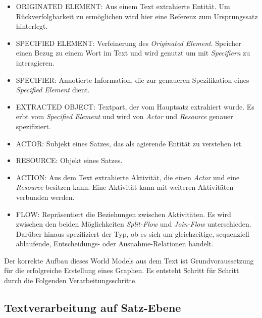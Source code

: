 \begin{itemize} 
\item ORIGINATED ELEMENT: Aus einem Text extrahierte Entität. Um Rückverfolgbarkeit zu ermöglichen wird hier eine Referenz zum Ursprungssatz hinterlegt.
\item SPECIFIED ELEMENT: Verfeinerung des \textit{Originated Element}. Speicher einen Bezug zu einem Wort im Text und wird genutzt um mit \textit{Specifiern} zu interagieren.
\item SPECIFIER: Annotierte Information, die zur genaueren Spezifikation eines \textit{Specified Element} dient.
\item EXTRACTED OBJECT: Textpart, der vom Hauptsatz extrahiert wurde. Es erbt vom \textit{Specified Element} und wird  von \textit{Actor} und \textit{Resource} genauer spezifiziert.
\item ACTOR: Subjekt eines Satzes, das als agierende Entität zu verstehen ist. 
\item RESOURCE: Objekt eines Satzes.
\item ACTION: Aus dem Text extrahierte Aktivität, die einen \textit{Actor} und eine \textit{Resource} besitzen kann. Eine Aktivität kann mit weiteren Aktivitäten verbunden werden.
\item FLOW: Repräsentiert die Beziehungen zwischen Aktivitäten. Es wird zwischen den beiden Möglichkeiten \textit{Split-Flow} und \textit{Join-Flow} unterschieden. Darüber hinaus spezifiziert der Typ, ob es sich um gleichzeitige, sequenziell ablaufende, Entscheidungs- oder Ausnahme-Relationen handelt.
\end{itemize}

Der korrekte Aufbau dieses World Models aus dem Text ist Grundvoraussetzung für die erfolgreiche Erstellung eines Graphen. Es entsteht Schritt für Schritt durch die Folgenden Verarbeitungsschritte.

\subsection{Textverarbeitung auf Satz-Ebene}

